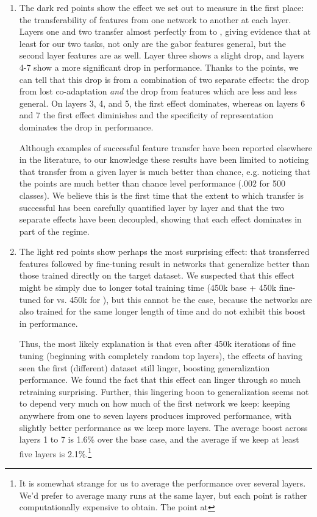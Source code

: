 \begin{enumerate}
\item The dark red  points show the effect we set out to measure in the first place: the transferability of features from one network to another at each layer. Layers one and two transfer almost perfectly from  to  , giving evidence that at least for our two tasks, not only are the gabor features general, but the second layer features are as well. Layer three shows a slight drop, and layers 4-7 show a more significant drop in performance. Thanks to the  points, we can tell that this drop is from a combination of two separate effects: the drop from lost co-adaptation \emph{and} the drop from features which are less and less general. On layers 3, 4, and 5, the first effect dominates, whereas on layers 6 and 7 the first effect diminishes and the specificity of representation dominates the drop in performance.

Although examples of successful feature transfer have been reported elsewhere in the literature, to our knowledge these results have been limited to noticing that transfer from a given layer is much better than chance, e.g. noticing that the  points are much better than chance level performance (.002 for 500 classes). We believe this is the first time that the extent to which transfer is successful has been carefully quantified layer by layer and that the two separate effects have been decoupled, showing that each effect dominates in part of the regime.

\item The light red  points show perhaps the most surprising effect: that transferred features followed by fine-tuning result in networks that generalize better than those trained directly on the target dataset. We suspected that this effect might be simply due to longer total training time (450k base + 450k fine-tuned for  vs. 450k for ), but this cannot be the case, because the  networks are also trained for the same longer length of time and do not exhibit this boost in performance.

Thus, the most likely explanation is that even after 450k iterations of fine tuning (beginning with completely random top layers), the effects of having seen the first (different) dataset still linger, boosting generalization performance. We found the fact that this effect can linger through so much retraining surprising. Further, this lingering boon to generalization seems not to depend very much on how much of the first network we keep: keeping anywhere from one to seven layers produces improved performance, with slightly better performance as we keep more layers. The average boost across layers 1 to 7 is 1.6\% over the base case, and the average if we keep at least five layers is 2.1\%.\footnote{It is somewhat strange for us to average the performance over several layers. We'd prefer to average many runs at the same layer, but each point is rather computationally expensive to obtain. The  point at }


\end{enumerate}
